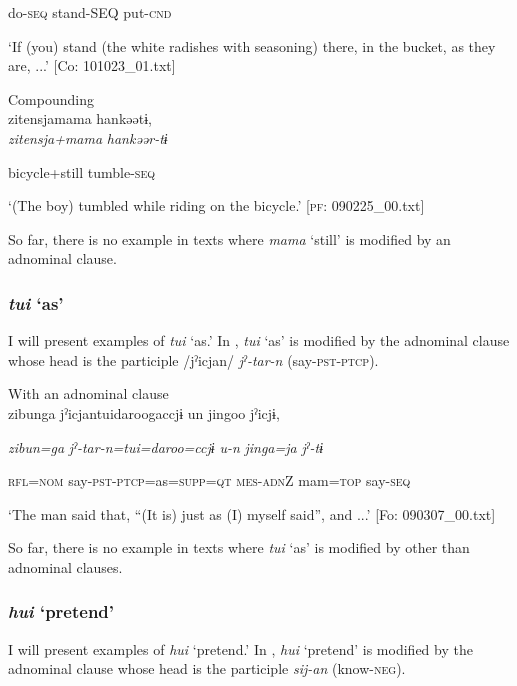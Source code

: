       do-\textsc{seq}  stand-SEQ  put-\textsc{cnd}

\glt ‘If (you) stand (the white radishes with seasoning) there, in the bucket, as they are, ...’ [Co: 101023\_01.txt]
\z

 \ex Compounding\\
{\TM}
\gll  {\textbar}zitensja{\textbar}mama  hankəətɨ,\\

      \textit{zitensja+mama}  \textit{hankəər-tɨ}

      bicycle+still  tumble-\textsc{seq}

\glt ‘(The boy) tumbled while riding on the bicycle.’ [\textsc{pf}: 090225\_00.txt]
\z

So far, there is no example in texts where \textit{mama} ‘still’ is modified by an adnominal clause.

\subsubsection{ \textit{tui} ‘as’}

I will present examples of \textit{tui} ‘as.’ In , \textit{tui} ‘as’ is modified by the adnominal clause whose head is the participle /jˀicjan/ \textit{jˀ-tar-n} (say-\textsc{pst}-\textsc{ptcp}).

\ea\label{ex:6-28}
 With an adnominal clause\\

{\TM}
\gll {\textbar}zibunga{\textbar}  jˀicjantuidaroogaccjɨ  un  jingoo  jˀicjɨ,

    \textit{zibun=ga}  \textit{jˀ-tar-n=tui=daroo=ccjɨ}  \textit{u-n}  \textit{jinga=ja}  \textit{jˀ-tɨ}

    \textsc{rfl}=\textsc{nom}  say-\textsc{pst}-\textsc{ptcp}=as=\textsc{supp}=\textsc{qt}  \textsc{mes}-\textsc{adn}Z  mam=\textsc{top}  say-\textsc{seq}

\glt    ‘The man said that, “(It is) just as (I) myself said”, and ...’ [Fo: 090307\_00.txt]
\z

So far, there is no example in texts where \textit{tui} ‘as’ is modified by other than adnominal clauses.

\subsubsection{ \textit{hui} ‘pretend’}

I will present examples of \textit{hui} ‘pretend.’ In , \textit{hui} ‘pretend’ is modified by the adnominal clause whose head is the participle \textit{sij-an} (know-\textsc{neg}).


